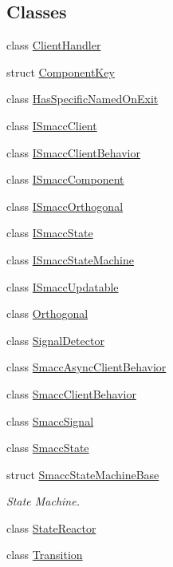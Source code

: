 \subsection*{Classes}
\begin{DoxyCompactItemize}
\item 
class \hyperlink{classsmacc_1_1ClientHandler}{Client\+Handler}
\item 
struct \hyperlink{structsmacc_1_1ComponentKey}{Component\+Key}
\item 
class \hyperlink{classsmacc_1_1HasSpecificNamedOnExit}{Has\+Specific\+Named\+On\+Exit}
\item 
class \hyperlink{classsmacc_1_1ISmaccClient}{I\+Smacc\+Client}
\item 
class \hyperlink{classsmacc_1_1ISmaccClientBehavior}{I\+Smacc\+Client\+Behavior}
\item 
class \hyperlink{classsmacc_1_1ISmaccComponent}{I\+Smacc\+Component}
\item 
class \hyperlink{classsmacc_1_1ISmaccOrthogonal}{I\+Smacc\+Orthogonal}
\item 
class \hyperlink{classsmacc_1_1ISmaccState}{I\+Smacc\+State}
\item 
class \hyperlink{classsmacc_1_1ISmaccStateMachine}{I\+Smacc\+State\+Machine}
\item 
class \hyperlink{classsmacc_1_1ISmaccUpdatable}{I\+Smacc\+Updatable}
\item 
class \hyperlink{classsmacc_1_1Orthogonal}{Orthogonal}
\item 
class \hyperlink{classsmacc_1_1SignalDetector}{Signal\+Detector}
\item 
class \hyperlink{classsmacc_1_1SmaccAsyncClientBehavior}{Smacc\+Async\+Client\+Behavior}
\item 
class \hyperlink{classsmacc_1_1SmaccClientBehavior}{Smacc\+Client\+Behavior}
\item 
class \hyperlink{classsmacc_1_1SmaccSignal}{Smacc\+Signal}
\item 
class \hyperlink{classsmacc_1_1SmaccState}{Smacc\+State}
\item 
struct \hyperlink{structsmacc_1_1SmaccStateMachineBase}{Smacc\+State\+Machine\+Base}
\begin{DoxyCompactList}\small\item\em State Machine. \end{DoxyCompactList}\item 
class \hyperlink{classsmacc_1_1StateReactor}{State\+Reactor}
\item 
class \hyperlink{classsmacc_1_1Transition}{Transition}
\end{DoxyCompactItemize}
